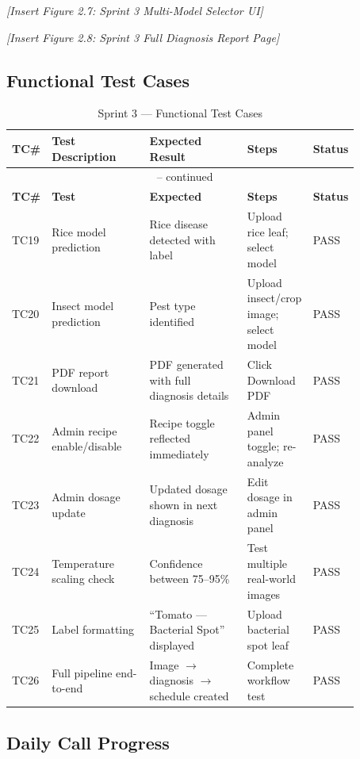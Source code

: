 \documentclass[12pt,a4paper]{report}
\begin{document}
\textit{[Insert Figure 2.7: Sprint 3 Multi-Model Selector UI]}

\textit{[Insert Figure 2.8: Sprint 3 Full Diagnosis Report Page]}

\subsection{Functional Test Cases}

\begin{longtable}{p{0.06\linewidth} p{0.28\linewidth} p{0.28\linewidth} p{0.15\linewidth} p{0.10\linewidth}}
\caption{Sprint 3 — Functional Test Cases} \label{tab:sprint3tc} \\
\toprule
\textbf{TC\#} & \textbf{Test Description} & \textbf{Expected Result} & \textbf{Steps} & \textbf{Status} \\
\midrule
\endfirsthead
\multicolumn{5}{c}{\tablename\ \thetable{} -- continued} \\
\toprule
\textbf{TC\#} & \textbf{Test} & \textbf{Expected} & \textbf{Steps} & \textbf{Status} \\
\midrule
\endhead
TC19 & Rice model prediction & Rice disease detected with label & Upload rice leaf; select 🌾 model & PASS \\
TC20 & Insect model prediction & Pest type identified & Upload insect/crop image; select 🦗 model & PASS \\
TC21 & PDF report download & PDF generated with full diagnosis details & Click Download PDF & PASS \\
TC22 & Admin recipe enable/disable & Recipe toggle reflected immediately & Admin panel toggle; re-analyze & PASS \\
TC23 & Admin dosage update & Updated dosage shown in next diagnosis & Edit dosage in admin panel & PASS \\
TC24 & Temperature scaling check & Confidence between 75--95\% & Test multiple real-world images & PASS \\
TC25 & Label formatting & ``Tomato — Bacterial Spot'' displayed & Upload bacterial spot leaf & PASS \\
TC26 & Full pipeline end-to-end & Image $\rightarrow$ diagnosis $\rightarrow$ schedule created & Complete workflow test & PASS \\
\bottomrule
\end{longtable}

\subsection{Daily Call Progress}
\end{document}
